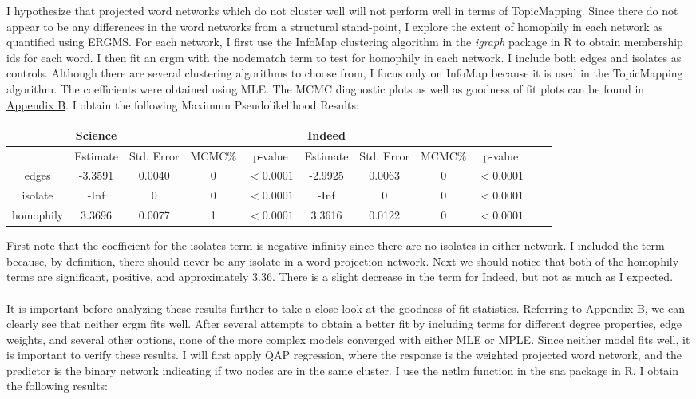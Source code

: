 \documentclass[12pt]{article}
\begin{document}
I hypothesize that projected word networks which do not cluster well will not perform well in terms of TopicMapping. Since there do not appear to be any differences in the word networks from a structural stand-point, I explore the extent of homophily in each network as quantified using ERGMS. For each network, I first use the InfoMap clustering algorithm in the \textit{igraph} package in R to obtain membership ids for each word. I then fit an ergm with the nodematch term to test for homophily in each network. I include both edges and isolates as controls. Although there are several clustering algorithms to choose from, I focus only on InfoMap because it is used in the TopicMapping algorithm. The coefficients were obtained using MLE. The MCMC diagnostic plots as well as goodness of fit plots can be found in \hyperlink{B}{Appendix B}. I obtain the following Maximum Pseudolikelihood Results:
\vspace{2mm}
\begin{center}
	\begin{tabular}{ |c|c|c|c|c||c|c|c|c|c|c|  }
		\hline
		&Science&&&&Indeed&&& \\
		\hline
		&Estimate&Std. Error&MCMC$\%$&p-value&Estimate&Std. Error&MCMC$\%$&p-value \\ 
		\hline 
		edges&-3.3591&0.0040&0&$<0.0001$&-2.9925&0.0063&0&$<0.0001$\\
		isolate&-Inf&0&0&$<0.0001$&-Inf&0&0&$<0.0001$\\
		homophily&3.3696&0.0077&1&$<0.0001$&3.3616&0.0122&0&$<0.0001$\\
		\hline
	\end{tabular}
\end{center}
\vspace{2mm}
First note that the coefficient for the isolates term is negative infinity since there are no isolates in either network. I included the term because, by definition, there should never be any isolate in a word projection network. Next we should notice that both of the homophily terms are significant, positive, and approximately $3.36$. There is a slight decrease in the term for Indeed, but not as much as I expected. 
\\
\\
It is important before analyzing these results further to take a close look at the goodness of fit statistics. Referring to \hyperlink{B}{Appendix B}, we can clearly see that neither ergm fits well. After several attempts to obtain a better fit by including terms for different degree properties, edge weights, and several other options, none of the more complex models converged with either MLE or MPLE. Since neither model fits well, it is important to verify these results. I will first apply QAP regression, where the response is the weighted projected word network, and the predictor is the binary network indicating if two nodes are in the same cluster. I use the netlm function in the sna package in R. I obtain the following results:
\end{document}
